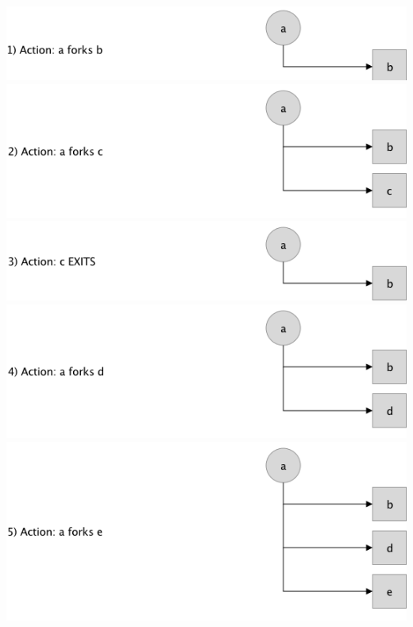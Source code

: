 \documentclass[12pt]{article}
\begin{document}
\begin{enumerate}[1.]
    \begin{center}
    \includegraphics[width=\linewidth]{images/worksheet_2_solution_1.png}
    \includegraphics[width=\linewidth]{images/worksheet_2_solution_2.png}
    \includegraphics[width=\linewidth]{images/worksheet_2_solution_3.png}
    \includegraphics[width=\linewidth]{images/worksheet_2_solution_4.png}
    \includegraphics[width=\linewidth]{images/worksheet_2_solution_5.png}
    \end{center}


\end{enumerate}
\end{document}
